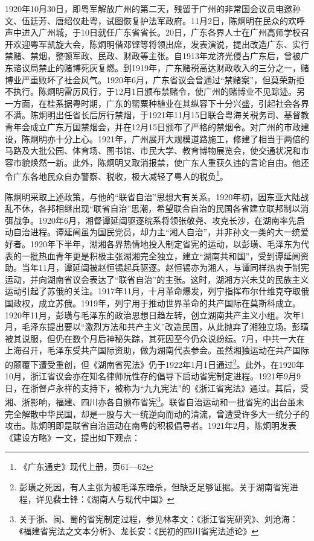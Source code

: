 1920年10月30日，即粤军解放广州的第二天，残留于广州的非常国会议员电邀孙文、伍廷芳、唐绍仪赴粤，试图恢复护法军政府。11月2日，陈炯明在民众的欢呼声中进入广州城，于10日就任广东省省长。20日，广东各界人士在广州高师学校召开欢迎粤军凯旋大会，陈炯明偕邓铿等将领出席，发表演说，提出改造广东、实行禁赌、禁烟，整顿军政、民政、财政等主张。自1913年龙济光侵占广东后，曾被广东谘议局禁止的赌博死灰复燃。到1919年，广东赌税高达财政收入的三分之一，赌博业严重败坏了社会风气。1920年6月，广东省议会曾通过“禁赌案”，但莫荣新拒不执行。陈炯明雷厉风行，于12月1日颁布禁赌令，使广州的赌博业不见踪迹。另一方面，在桂系据粤时期，广东的罂粟种植业在其纵容下十分兴盛，引起社会各界不满。陈炯明出任省长后厉行禁烟，于1921年11月15日联合粤海关税务司、基督教青年会成立广东万国禁烟会，并在12月15日颁布了严格的禁烟令。对广州的市政建设，陈炯明亦十分上心。1921年，广州展开大规模道路施工，修建了相当于两倍的马路及大批公园、体育场、图书馆、市民大学、教育博物展览会，使交通状况和市容市貌焕然一新。此外，陈炯明又取消报禁，使广东人重获久违的言论自由。他还令广东各地民众自办警察、税收，极大减轻了粤人的税负\footnote{《广东通史》现代上册，页61—62}。

陈炯明采取上述政策，与他的“联省自治”思想大有关系。1920年初，因东亚大陆战乱不休，各邦相继出现“联省自治”思潮，希望联合自治的民国各省建立联邦制以消弭战争。1920年6月，湘督谭延闿驱逐皖系将领张敬尧、攻克长沙，在湖南率先启动自治进程。谭延闿虽为国民党员，却力主“湘人自治”，并非孙文一类的大一统爱好者。1920年下半年，湖湘各界热情地投入制定省宪的运动，以彭璜、毛泽东为代表的一批热血青年更是积极主张湖湘完全独立，建立“湖南共和国”，受到谭延闿资助。当年11月，谭延闿被赵恒锡起兵驱逐。赵恒锡亦为湘人，与谭同样热衷于制宪运动，并向湖南省议会表达了“联省自治”的主张。这时，湖湘方兴未艾的民族主义运动引起了苏俄的关注。1917年11月，十月革命爆发，列宁指挥布尔什维克夺取俄国政权，成立苏俄。1919年，列宁用于推动世界革命的共产国际在莫斯科成立。1920年11月，彭璜与毛泽东的政治思想日趋左转，创立湖南共产主义小组。次年1月，毛泽东提出要以“激烈方法和共产主义”改造民国，从此抛弃了湘独立场。彭璜被其说服，但仍在数个月后神秘失踪，其死因至今仍众说纷纭。7月，中共一大在上海召开，毛泽东受共产国际资助，做为湖南代表参会。虽然湘独运动在共产国际的颠覆下遭受重创，但《湖南省宪法》仍于1922年1月1日通过\footnote{彭璜之死因，有人主张为被毛泽东暗杀，但缺乏足够证据。关于湖南省宪进程，详见裴士锋：《湖南人与现代中国》}。此外，在1920年10月，浙江省议会亦在知名律师阮性存的倡导下启动省宪制定进程。1921年9月9日，在浙督卢永祥的支持下，被称为“九九宪法”的《浙江省宪法》通过。其后，受湘、浙影响，福建、四川亦各自颁布省宪\footnote{关于浙、闽、蜀的省宪制定过程，参见林孝文：《浙江省宪研究》、刘沧海：《福建省宪法之文本分析》、龙长安：《民初的四川省宪法述论》}。联省自治运动和一批省宪的出台虽未完全解散中华民国，却是一股与大一统逆向而动的清流，曾遭受许多大一统分子的攻击。陈炯明即是联省自治运动在南粤的积极倡导者。1921年2月，陈炯明发表《建设方略》一文，提出如下观点：

